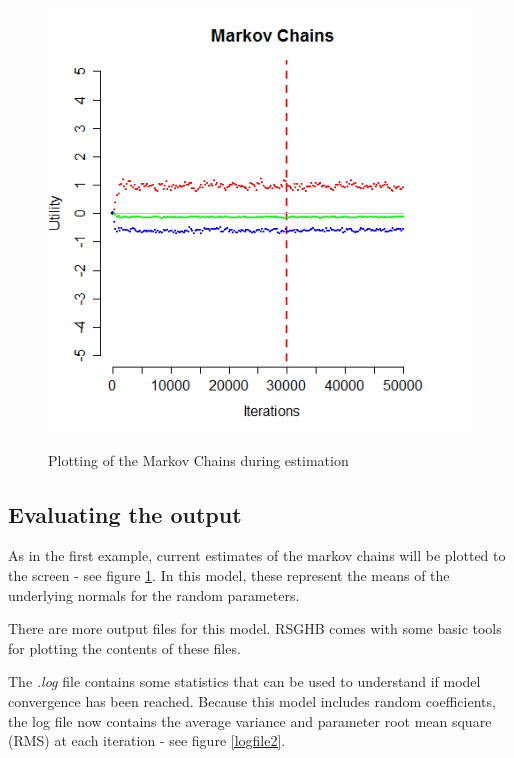 \documentclass{article}\usepackage{graphicx, color}
\begin{document}
\begin{figure}
\caption{Plotting of the Markov Chains during estimation}
\includegraphics[scale=0.50]{MNL_markovChains2.png}
\label{MarkovChain2}
\end{figure}


\subsection*{Evaluating the output}

As in the first example, current estimates of the markov chains will be plotted to the screen - see figure \ref{MarkovChain2}. In this model, these represent the means of the underlying normals for the random parameters.

There are more output files for this model. RSGHB comes with some basic tools for plotting the contents of these files.

The \emph{.log} file contains some statistics that can be used to understand if model convergence has been reached. Because this model includes random coefficients, the log file now contains the average variance and parameter root mean square (RMS) at each iteration - see figure \ref{logfile2}. 
\end{document}
